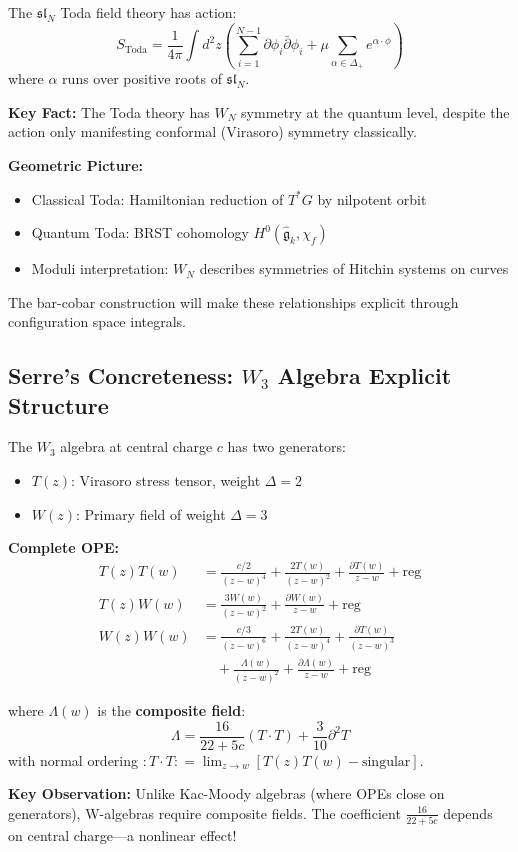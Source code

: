 \begin{construction}
The $\mathfrak{sl}_N$ Toda field theory has action:
$$S_{\text{Toda}} = \frac{1}{4\pi} \int d^2z \left(\sum_{i=1}^{N-1} \partial \phi_i \bar{\partial}\phi_i + \mu \sum_{\alpha \in \Delta_+} e^{\alpha \cdot \phi}\right)$$
where $\alpha$ runs over positive roots of $\mathfrak{sl}_N$.

\textbf{Key Fact:} The Toda theory has $W_N$ symmetry at the quantum level, despite the action only manifesting conformal (Virasoro) symmetry classically.

\textbf{Geometric Picture:}
\begin{itemize}
\item Classical Toda: Hamiltonian reduction of $T^*G$ by nilpotent orbit
\item Quantum Toda: BRST cohomology $H^0(\widehat{\mathfrak{g}}_k, \chi_f)$
\item Moduli interpretation: $W_N$ describes symmetries of Hitchin systems on curves
\end{itemize}

The bar-cobar construction will make these relationships explicit through configuration space integrals.
\end{construction}

\subsection{Serre's Concreteness: $W_3$ Algebra Explicit Structure}

\begin{example}
The $W_3$ algebra at central charge $c$ has two generators:
\begin{itemize}
\item $T(z)$: Virasoro stress tensor, weight $\Delta = 2$
\item $W(z)$: Primary field of weight $\Delta = 3$
\end{itemize}

\textbf{Complete OPE:}
\begin{align}
T(z)T(w) &= \frac{c/2}{(z-w)^4} + \frac{2T(w)}{(z-w)^2} + \frac{\partial T(w)}{z-w} + \text{reg} \label{eq:w3-TT} \\
T(z)W(w) &= \frac{3W(w)}{(z-w)^2} + \frac{\partial W(w)}{z-w} + \text{reg} \label{eq:w3-TW} \\
W(z)W(w) &= \frac{c/3}{(z-w)^6} + \frac{2T(w)}{(z-w)^4} + \frac{\partial T(w)}{(z-w)^3} \nonumber \\
&\quad + \frac{\Lambda(w)}{(z-w)^2} + \frac{\partial\Lambda(w)}{z-w} + \text{reg} \label{eq:w3-WW}
\end{align}

where $\Lambda(w)$ is the \textbf{composite field}:
$$\Lambda = \frac{16}{22+5c}(T \cdot T) + \frac{3}{10}\partial^2 T$$
with normal ordering $: T \cdot T : = \lim_{z \to w}[T(z)T(w) - \text{singular}]$.

\textbf{Key Observation:} Unlike Kac-Moody algebras (where OPEs close on generators), W-algebras require composite fields. The coefficient $\frac{16}{22+5c}$ depends on central charge—a nonlinear effect!
\end{example}

